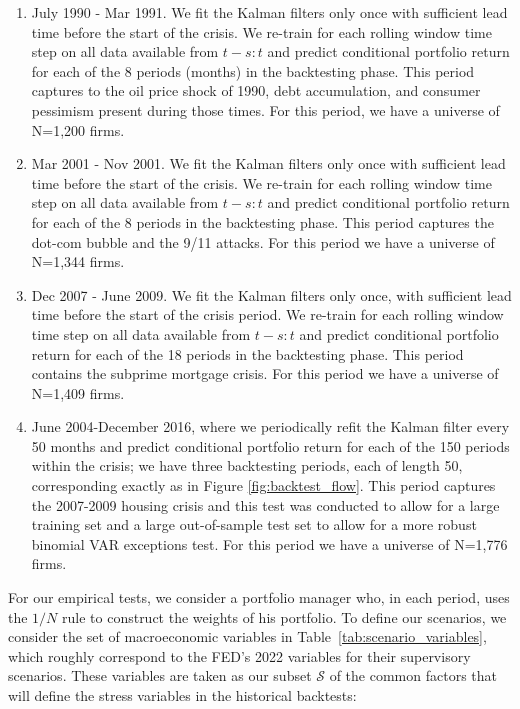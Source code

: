 \documentclass[11pt]{article}
\theoremstyle{plain}
\theoremstyle{definition}
\theoremstyle{remark}
\numberwithin{equation}{section}
\begin{document}
\begin{enumerate}
    \item July 1990 - Mar 1991. We fit the Kalman filters only once with sufficient lead time before the start of the crisis. We re-train for each rolling  window time step on all data available from $t-s:t$ and predict conditional portfolio return for each of the 8 periods (months) in the backtesting phase. This period captures to the oil price shock of 1990, debt accumulation, and consumer pessimism present during those times. For this period, we have a universe of N=1,200 firms.
    \item Mar 2001 - Nov 2001. We fit the Kalman filters only once with sufficient lead time before the start of the crisis. We re-train for each rolling window time step on all data available from $t-s:t$ and predict conditional portfolio return for each of the 8 periods in the backtesting phase. This period captures the dot-com bubble and the 9/11 attacks. For this period we have a universe of N=1,344 firms. 
    \item Dec 2007 - June 2009. We fit the Kalman filters only once, with sufficient lead time before the start of the crisis period. We re-train for each rolling window time step on all data available from $t-s:t$ and predict conditional portfolio return for each of the 18 periods in the backtesting phase. This period contains the subprime mortgage crisis. For this period we have a universe of N=1,409 firms. 
    \item June 2004-December 2016, where we periodically refit the Kalman filter every 50 months and predict conditional portfolio return for each of the 150 periods within the crisis; we have three backtesting periods, each of length 50, corresponding exactly as in Figure \ref{fig:backtest_flow}. This period captures the 2007-2009 housing crisis and this test was conducted to allow for a large training set and a large out-of-sample test set to allow for a more robust binomial VAR exceptions test. For this period we have a universe of N=1,776 firms.
\end{enumerate}

 For our empirical tests, we consider a portfolio manager who, in each period, uses the $1/N$ rule to construct the weights of his portfolio. To define our scenarios, we consider the set of macroeconomic variables in Table~\ref{tab:scenario_variables}, which roughly correspond to the FED's 2022 variables for their supervisory scenarios. These variables are taken as our subset $\mathcal{S}$ of the common factors that will define the stress variables in the historical backtests:
\end{document}
